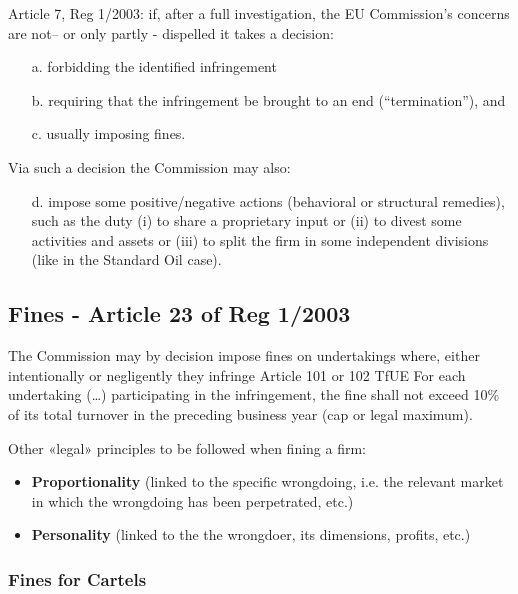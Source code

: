         Article 7, Reg 1/2003: if, after a full investigation, the EU Commission's concerns are not– or only partly - dispelled it takes a decision: 
        \begin{itemize}
            \item[a.] forbidding the identified infringement
            \item[b.] requiring that the infringement be brought to an end (“termination”), and
            \item[c. ]usually imposing fines. 
        \end{itemize}

        Via such a decision the Commission may also:
        \begin{itemize}
            \item[d.] impose some positive/negative actions (behavioral or structural remedies), such as the duty (i) to share a proprietary input or (ii) to divest some activities and assets or (iii) to split the firm in some independent divisions (like in the Standard Oil case).
        \end{itemize}

    \subsection{Fines - Article 23 of Reg 1/2003}

        The Commission may by decision impose fines on undertakings where, either intentionally or negligently they infringe Article 101 or 102 TfUE For each undertaking (…) participating in the infringement, the fine shall not exceed 10\% of its total turnover in the preceding business year (cap or legal maximum).


        Other «legal» principles to be followed when fining a firm:
        \begin{itemize}
            \item \textbf{Proportionality} (linked to the specific wrongdoing, i.e. the relevant market in which the wrongdoing has been perpetrated, etc.)
            \item \textbf{Personality} (linked to the the wrongdoer, its dimensions, profits, etc.)
        \end{itemize}

        \subsubsection{Fines for Cartels}

